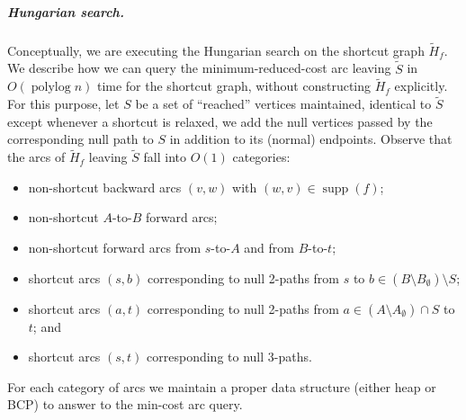 \documentclass[a4paper,UKenglish]{socg-lipics-v2018}
\makeatletter
\def\polylog{\mathop{\mathrm{polylog}}}
\def\eps{\varepsilon}
\DeclareMathOperator*{\argmin}{arg\,min}
\def\fsupply{\phi}
\def\supp{\operatorname{supp}}
\theoremstyle{plain}
\numberwithin{figure}{section}
\renewcommand{\paragraph}{\subparagraph}
\def\EMPH#1{\textcolor{BrickRed}{{\emph{#1}}}}
\def\n@te#1{\textsf{\boldmath \textbf{$\langle\!\langle$#1$\rangle\!\rangle$}}\leavevmode}
\def\note#1{\textcolor{red}{\n@te{#1}}}
\renewcommand{\note}[1]{} %
\makeatother
\begin{document}
\paragraph{Hungarian search.}
%
%
Conceptually, we are executing the Hungarian search
on the shortcut graph $\tilde{H}_f$.
We describe how we can query the minimum-reduced-cost arc leaving $\tilde{S}$ in
$O(\polylog n)$ time for the shortcut graph, without constructing
$\tilde{H}_f$ explicitly.
For this purpose, let \EMPH{$S$} be a set of ``reached'' vertices maintained,
identical to $\tilde{S}$ except whenever a shortcut is relaxed, we add the null vertices passed by the corresponding null path to $S$ in addition to its (normal) endpoints.
%
Observe that the arcs of $\tilde{H}_f$ leaving $\tilde{S}$ fall into $O(1)$ categories:
\begin{itemize}\itemsep=0pt
\item non-shortcut backward arcs $(v, w)$ with $(w, v) \in \supp(f)$;
\item non-shortcut $A$-to-$B$ forward arcs;
\item non-shortcut forward arcs from $s$-to-$A$ and from $B$-to-$t$;
\item shortcut arcs $(s, b)$ corresponding to null 2-paths from $s$ to
	$b \in (B \setminus B_\emptyset) \setminus S$;
\item shortcut arcs $(a, t)$ corresponding to null 2-paths from
	$a \in (A \setminus A_\emptyset) \cap S$ to $t$; and
\item shortcut arcs $(s, t)$ corresponding to null 3-paths.
\end{itemize}
For each category of arcs we maintain a proper data structure (either heap or BCP) to answer to the min-cost arc query.
\end{document}
